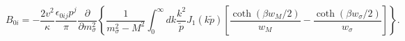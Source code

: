 \begin{equation}\label{integral}
B_{0i} = - \frac{2 v^2}{\kappa} \frac{\epsilon_{0ij} p^j}{\pi}
\frac{\partial}{\partial m_{\sigma}^2} \left\{ \frac{1}{m_{\sigma}^2 -
M^2}\int_0^{\infty} dk \frac{k^2}{\tilde p} J_1 (k \tilde p )
\left[\frac{\coth{(\beta w_M/2)}}{w_M} - \frac{\coth(\beta
w_{\sigma}/2)}{w_{\sigma}} \right]\right\}.
\end{equation}

